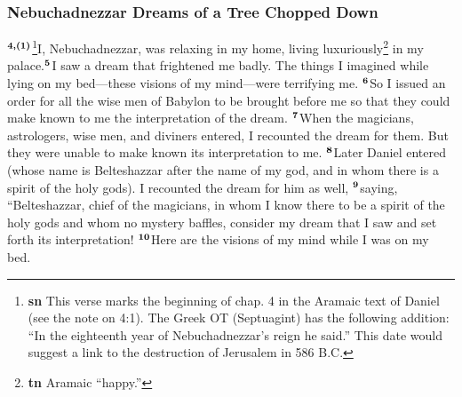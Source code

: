 \documentclass[12pt,a4paper,final]{article}
\renewcommand{\textsuperscript}[1]{\ensuremath{^{\textbf{\scriptsize #1}}}}
\begin{document}
\subsubsection*{Nebuchadnezzar Dreams of a Tree Chopped Down}

\textsuperscript{4,(1)}\footnote{\textbf{sn} This verse marks the beginning of chap. 4 in the Aramaic text of Daniel (see the note on 4:1). The Greek OT (Septuagint) has the following addition: “In the eighteenth year of Nebuchadnezzar’s reign he said.” This date would suggest a link to the destruction of Jerusalem in 586 B.C.}I, Nebuchadnezzar, was relaxing in my home, living luxuriously\footnote{\textbf{tn} Aramaic “happy.”} in my palace.\textsuperscript{5}I saw a dream that frightened me badly. The things I imagined while lying on my bed—these visions of my mind—were terrifying me. \textsuperscript{6}So I issued an order for all the wise men of Babylon to be brought before me so that they could make known to me the interpretation of the dream. \textsuperscript{7}When the magicians, astrologers, wise men, and diviners entered, I recounted the dream for them. But they were unable to make known its interpretation to me. \textsuperscript{8}Later Daniel entered (whose name is Belteshazzar after the name of my god, and in whom there is a spirit of the holy gods). I recounted the dream for him as well, \textsuperscript{9}saying, “Belteshazzar, chief of the magicians, in whom I know there to be a spirit of the holy gods and whom no mystery baffles, consider my dream that I saw and set forth its interpretation! \textsuperscript{10}Here are the visions of my mind while I was on my bed. 
\end{document}
